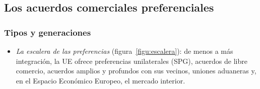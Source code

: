 \documentclass[11pt]{article}
\begin{document}
\subsection{Los acuerdos comerciales preferenciales}\label{sec:preferenciales}

\subsubsection{Tipos y generaciones}\label{sec:generaciones}

\begin{itemize}
\item \emph{La escalera de las preferencias} (figura~\ref{figu:escalera}): de menos a más integración, la UE ofrece preferencias unilaterales (SPG), acuerdos de libre comercio, acuerdos amplios y profundos con sus vecinos, uniones aduaneras y, en el Espacio Económico Europeo, el mercado interior.
\end{itemize}

\begin{infografia}[H]
\centering
\caption{La escalera de las preferencias comerciales de la UE en 2026}\label{figu:escalera}
\end{infografia}
\end{document}

